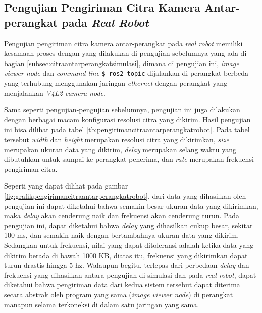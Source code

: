 \subsection{Pengujian Pengiriman Citra Kamera Antar-perangkat pada \emph{Real Robot}}
\label{subsec:citraantarperangkatrobot}

Pengujian pengiriman citra kamera antar-perangkat pada \emph{real robot} memiliki kesamaan proses dengan yang dilakukan di pengujian sebelumnya yang ada di bagian \ref{subsec:citraantarperangkatsimulasi},
  dimana di pengujian ini, \emph{image viewer node} dan \emph{command-line} \lstinline{$ ros2 topic} dijalankan di perangkat berbeda yang terhubung menggunakan jaringan \emph{ethernet} dengan perangkat yang menjalankan \emph{V4L2 camera node}.

Sama seperti pengujian-pengujian sebelumnya,
  pengujian ini juga dilakukan dengan berbagai macam konfigurasi resolusi citra yang dikirim.
Hasil pengujian ini bisa dilihat pada tabel \ref{tb:pengirimancitraantarperangkatrobot}.
Pada tabel tersebut \emph{width} dan \emph{height} merupakan resolusi citra yang dikirimkan,
  \emph{size} merupakan ukuran data yang dikirim,
  \emph{delay} merupakan selang waktu yang dibutuhkan untuk sampai ke perangkat penerima,
  dan \emph{rate} merupakan frekuensi pengiriman citra.





Seperti yang dapat dilihat pada gambar \ref{fig:grafikpengirimancitraantarperangkatrobot},
  dari data yang dihasilkan oleh pengujian ini dapat diketahui bahwa semakin besar ukuran data yang dikirimkan,
  maka \emph{delay} akan cenderung naik dan frekuensi akan cenderung turun.
Pada pengujian ini, dapat diketahui bahwa \emph{delay} yang dihasilkan cukup besar,
  sekitar 100 ms, dan semakin naik dengan bertambahnya ukuran data yang dikirim.
Sedangkan untuk frekuensi,
  nilai yang dapat ditoleransi adalah ketika data yang dikirim berada di bawah 1000 KB,
  diatas itu, frekuensi yang dikirimkan dapat turun drastis hingga 5 hz.
Walaupun begitu, terlepas dari perbedaan \emph{delay} dan frekuensi yang dihasilkan antara pengujian di simulasi dan pada \emph{real robot},
  dapat diketahui bahwa pengiriman data dari kedua sistem tersebut dapat diterima secara abstrak oleh program yang sama (\emph{image viewer node}) di perangkat manapun selama terkoneksi di dalam satu jaringan yang sama.
